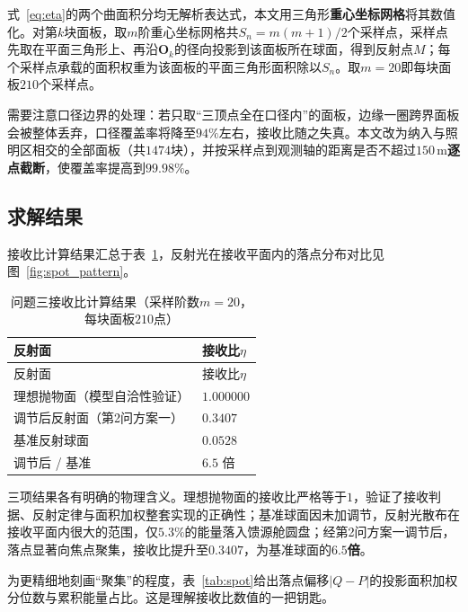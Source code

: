 \documentclass[withoutpreface]{cumcmthesis}
\begin{document}
式~\eqref{eq:eta}的两个曲面积分均无解析表达式，本文用三角形\textbf{重心坐标网格}将其数值化\cite{liqingyang}。对第$k$块面板，取$m$阶重心坐标网格共$S_n=m(m+1)/2$个采样点，采样点先取在平面三角形上、再沿$\mathbf{O}_k$的径向投影到该面板所在球面，得到反射点$M$；每个采样点承载的面积权重为该面板的平面三角形面积除以$S_n$。取$m=20$即每块面板$210$个采样点。

需要注意口径边界的处理：若只取``三顶点全在口径内''的面板，边缘一圈跨界面板会被整体丢弃，口径覆盖率将降至$94\%$左右，接收比随之失真。本文改为纳入与照明区相交的全部面板（共$1474$块），并按采样点到观测轴的距离是否不超过$150\,\mathrm{m}$\textbf{逐点截断}，使覆盖率提高到$99.98\%$。

\subsection{求解结果}\label{sec:q3_result}

接收比计算结果汇总于表~\ref{tab:q3_result}，反射光在接收平面内的落点分布对比见图~\ref{fig:spot_pattern}。

\begin{longtable}{p{6.2cm}p{6.8cm}}
\caption{问题三接收比计算结果（采样阶数$m=20$，每块面板$210$点）} \label{tab:q3_result} \\
\toprule
反射面 & 接收比$\eta$ \\
\midrule
\endfirsthead
\toprule
反射面 & 接收比$\eta$ \\
\midrule
\endhead
\bottomrule
\endfoot
\bottomrule
\endlastfoot
理想抛物面（模型自洽性验证） & $1.000000$ \\
调节后反射面（第2问方案一） & $\mathbf{0.3407}$ \\
基准反射球面 & $0.0528$ \\
\midrule
调节后 / 基准 & $6.5$ 倍 \\
\bottomrule
\end{longtable}

三项结果各有明确的物理含义。理想抛物面的接收比严格等于$1$，验证了接收判据、反射定律与面积加权整套实现的正确性；基准球面因未加调节，反射光散布在接收平面内很大的范围，仅$5.3\%$的能量落入馈源舱圆盘；经第2问方案一调节后，落点显著向焦点聚集，接收比提升至$0.3407$，为基准球面的\textbf{$6.5$倍}。

为更精细地刻画``聚集''的程度，表~\ref{tab:spot}给出落点偏移$|Q-P|$的投影面积加权分位数与累积能量占比。这是理解接收比数值的一把钥匙。
\end{document}

